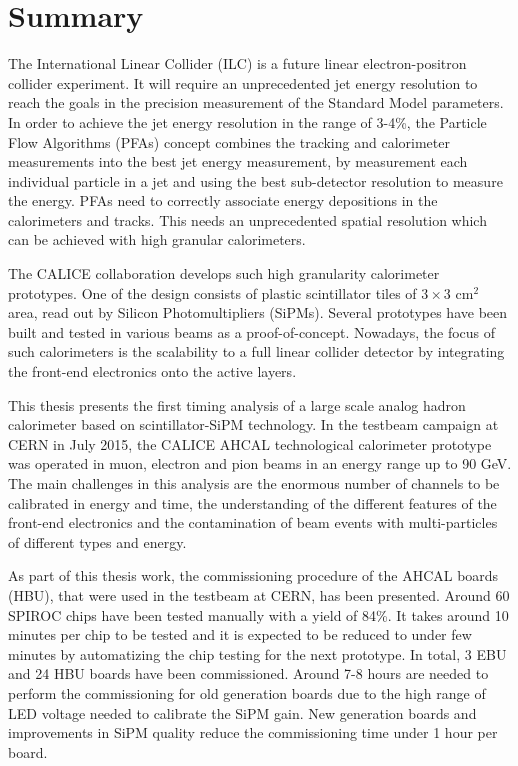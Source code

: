 \chapter{Summary}

The International Linear Collider (ILC) is a future linear electron-positron collider experiment. It will require an unprecedented jet energy resolution to reach the goals in the precision measurement of the Standard Model parameters. In order to achieve the jet energy resolution in the range of 3-4\%, the Particle Flow Algorithms (PFAs) concept combines the tracking and calorimeter measurements into the best jet energy measurement, by measurement each individual particle in a jet and using the best sub-detector resolution to measure the energy. PFAs need to correctly associate energy depositions in the calorimeters and tracks. This needs an unprecedented spatial resolution which can be achieved with high granular calorimeters.

The CALICE collaboration develops such high granularity calorimeter prototypes. One of the design consists of plastic scintillator tiles of $3\times3$ cm$^2$ area, read out by Silicon Photomultipliers (SiPMs). Several prototypes have been built and tested in various beams as a proof-of-concept. Nowadays, the focus of such calorimeters is the scalability to a full linear collider detector by integrating the front-end electronics onto the active layers.

This thesis presents the first timing analysis of a large scale analog hadron calorimeter based on scintillator-SiPM technology. In the testbeam campaign at CERN in July 2015, the CALICE AHCAL technological calorimeter prototype was operated in muon, electron and pion beams in an energy range up to 90 GeV. The main challenges in this analysis are the enormous number of channels to be calibrated in energy and time, the understanding of the different features of the front-end electronics and the contamination of beam events with multi-particles of different types and energy.

As part of this thesis work, the commissioning procedure of the AHCAL boards (HBU), that were used in the testbeam at CERN, has been presented. Around 60 SPIROC chips have been tested manually with a yield of 84\%. It takes around 10 minutes per chip to be tested and it is expected to be reduced to under few minutes by automatizing the chip testing for the next prototype. In total, 3 EBU and 24 HBU boards have been commissioned. Around 7-8 hours are needed to perform the commissioning for old generation boards due to the high range of LED voltage needed to calibrate the SiPM gain. New generation boards and improvements in SiPM quality reduce the commissioning time under 1 hour per board.

